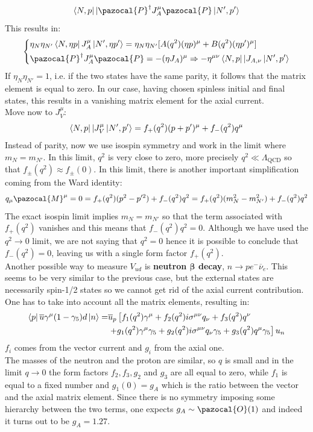 \documentclass[../main.tex]{subfiles}
\begin{document}
\[
\bra{N,p}|\pazocal{P}^\dagger J_A^\mu\pazocal{P}\ket{N',p'}
\]
This results in:
\[
\left\{
\begin{aligned}
&\eta_N\eta_{N'}\bra{N,\eta p}J_A^\mu\ket{N',\eta p'}=\eta_N\eta_{N'}[A(q^2)(\eta p)^\mu+B(q^2)(\eta p')^\mu]\\
&\pazocal{P}^\dagger J_A^\mu\pazocal{P}=-(\eta J_A)^\mu\Rightarrow-\eta^{\mu\nu}\bra{N,p}|J_{A,\nu}\ket{N',p'}
\end{aligned}
\right.
\]
If $\eta_N\eta_{N'}=1$, i.e. if the two states have the same parity, it follows that the matrix element is equal to zero. In our case, having chosen spinless initial and final states, this results in a vanishing matrix element for the axial current.\\
Move now to $J_V^\mu$:
\[
\bra{N,p}|J_V^\mu\ket{N',p'}=f_+(q^2)(p+p')^\mu+f_-(q^2)q^\mu
\]
Instead of parity, now we use isospin symmetry and work in the limit where $m_N=m_{N'}$. In this limit, $q^2$ is very close to zero, more precisely $q^2\ll\Lambda_{\text{QCD}}$ so that $f_\pm(q^2)\approx f_\pm(0)$. In this limit, there is another important simplification coming from the Ward identity:
\[
q_\mu\pazocal{M}^\mu=0=f_+(q^2)(p^2-p'^2)+f_-(q^2)q^2=f_+(q^2)(m_N^2-m_{N'}^2)+f_-(q^2)q^2
\]
The exact isospin limit implies $m_N=m_{N'}$ so that the term associated with $f_+(q^2)$ vanishes and this means that $f_-(q^2)q^2=0$. Although we have used the $q^2\to0$ limit, we are not saying that $q^2=0$ hence it is possible to conclude that $f_-(q^2)=0$, leaving us with a single form factor $f_+(q^2)$.\\
Another possible way to measure $V_{ud}$ is \textbf{neutron $\mathbf{\beta}$ decay}, $n\to pe^-\overline{\nu}_e$. This seems to be very similar to the previous case, but the external states are necessarily spin-1/2 states so we cannot get rid of the axial current contribution. One has to take into account all the matrix elements, resulting in:
\begin{align*}
\bra{p}\overline{u}\gamma^\mu(1-\gamma_5)d\ket{n}=&\overline{u}_p\left[f_1(q^2)\gamma^\mu+f_2(q^2)i\sigma^{\mu\nu}q_\nu+f_3(q^2)q^\nu\right.\\
&\left.+g_1(q^2)\gamma^\mu\gamma_5+g_2(q^2)i\sigma^{\mu\nu}q_\nu\gamma_5+g_3(q^2)q^\mu\gamma_5\right]u_n
\end{align*}
$f_i$ comes from the vector current and $g_i$ from the axial one.\\
The masses of the neutron and the proton are similar, so $q$ is small and in the limit $q\to0$ the form factors $f_2, f_3, g_2$ and $g_3$ are all equal to zero, while $f_1$ is equal to a fixed number and $g_1(0)=g_A$ which is the ratio between the vector and the axial matrix element. Since there is no symmetry imposing some hierarchy between the two terms, one expects $g_A\sim\pazocal{O}(1)$ and indeed it turns out to be $g_A=1.27$.\\
\end{document}
